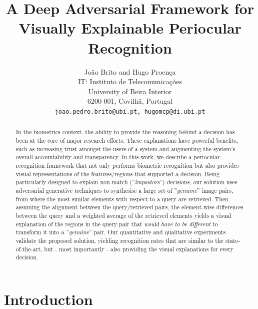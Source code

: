 \documentclass[final]{cvpr}
\begin{document}
\title{A Deep Adversarial Framework for Visually Explainable Periocular Recognition}

\author{João Brito and Hugo Proen\c{c}a\\
IT: Instituto de Telecomunica\c{c}\~oes\\
 University of Beira Interior\\
 6200-001, Covilh\~a, Portugal\\
{\tt\small joao.pedro.brito@ubi.pt, hugomcp@di.ubi.pt}
}

\maketitle



\begin{abstract}
   In the biometrics context, the ability to provide the reasoning behind a decision has been at the core of major research efforts. These explanations have powerful benefits, such as increasing trust amongst the users of a system and augmenting the system's overall accountability and transparency. In this work, we describe a periocular recognition framework that not only performs biometric recognition but also provides visual representations of the features/regions that supported a decision. Being particularly designed to explain non-match (''\emph{impostors}'') decisions, our solution uses adversarial generative techniques to synthesise a large set of ''\emph{genuine}'' image pairs, from where the most similar elements with respect to a query are retrieved. Then, assuming the alignment  between the query/retrieved pairs, the element-wise differences between the query and a weighted average of the retrieved elements yields a visual explanation of the regions in the query pair that \emph{would have to be different} to transform it into a ''\emph{genuine}'' pair. Our quantitative and qualitative experiments validate the proposed solution, yielding recognition rates that are similar to the state-of-the-art, but - most importantly - also providing the visual explanations for every decision. 
\end{abstract}

\section{Introduction}
\end{document}
